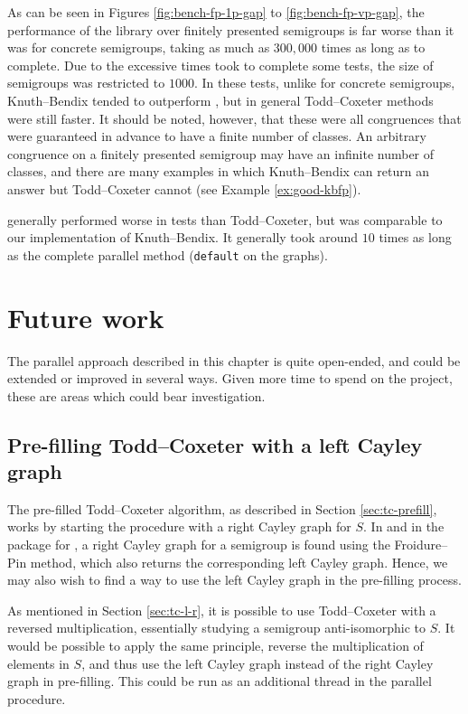 As can be seen in Figures \ref{fig:bench-fp-1p-gap} to \ref{fig:bench-fp-vp-gap}, the
performance of the \GAP{} library over finitely presented semigroups is far worse
than it was for concrete semigroups, taking as much as $300,000$ times as long
as \libsemigroups{} to complete.  Due to the excessive times \GAP{} took to
complete some tests, the size of semigroups was restricted to $1000$.  In these
tests, unlike for concrete semigroups,
Knuth--Bendix tended to outperform \GAP{}, but in
general Todd--Coxeter methods were still faster.  It should be noted, however,
that these were all congruences that were guaranteed in advance to have a finite
number of classes.  An arbitrary congruence on a finitely presented semigroup
may have an infinite number of classes, and there are many examples in which
Knuth--Bendix can return an answer but Todd--Coxeter cannot (see Example
\ref{ex:good-kbfp}).

\kbmag{} generally performed worse in tests than Todd--Coxeter, but was
comparable to our implementation of Knuth--Bendix.  It generally took around
$10$ times as long as the complete parallel method (\texttt{default} on the
graphs).

\section{Future work}

The parallel approach described in this chapter is quite open-ended, and could
be extended or improved in several ways.  Given more time to spend on the
project, these are areas which could bear investigation.

\subsection{Pre-filling Todd--Coxeter with a left Cayley graph}
\label{sec:prefill-left}
The pre-filled Todd--Coxeter algorithm, as described in Section
\ref{sec:tc-prefill}, works by starting the procedure with a right Cayley graph
for $S$.  In \libsemigroups{} and in the \Semigroups{} package for \GAP{}, a
right Cayley graph for a semigroup is found using the Froidure--Pin method, which
also returns the corresponding left Cayley graph.  Hence, we may also wish to
find a way to use the left Cayley graph in the pre-filling process.

As mentioned in Section \ref{sec:tc-l-r}, it is possible to use Todd--Coxeter
with a reversed multiplication, essentially studying a semigroup anti-isomorphic
to $S$.  It would be possible to apply the same principle, reverse the
multiplication of elements in $S$, and thus use the left Cayley graph instead of
the right Cayley graph in pre-filling.  This could be run as an additional
thread in the parallel procedure.

